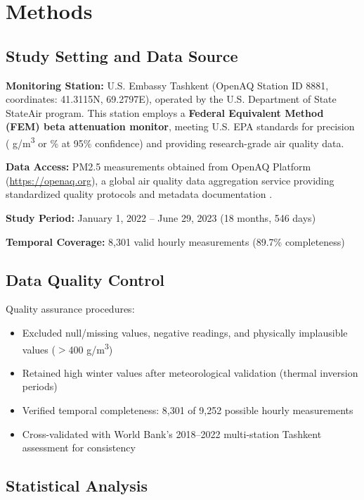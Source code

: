 \documentclass[11pt,a4paper]{article}
\begin{document}
\section{Methods}

\subsection{Study Setting and Data Source}

\textbf{Monitoring Station:} U.S. Embassy Tashkent (OpenAQ Station ID 8881, coordinates: 41.3115\textdegree N, 69.2797\textdegree E), operated by the U.S. Department of State StateAir program. This station employs a \textbf{Federal Equivalent Method (FEM) beta attenuation monitor}, meeting U.S. EPA standards for precision ( \textmu g/m\textsuperscript{3} or \% at 95\% confidence) and providing research-grade air quality data.

\textbf{Data Access:} PM2.5 measurements obtained from OpenAQ Platform (\url{https://openaq.org}), a global air quality data aggregation service providing standardized quality protocols and metadata documentation \citep{openaq2024}.

\textbf{Study Period:} January 1, 2022 -- June 29, 2023 (18 months, 546 days)

\textbf{Temporal Coverage:} 8,301 valid hourly measurements (89.7\% completeness)

\subsection{Data Quality Control}

Quality assurance procedures:
\begin{itemize}
    \item Excluded null/missing values, negative readings, and physically implausible values ($>$400 \textmu g/m\textsuperscript{3})
    \item Retained high winter values after meteorological validation (thermal inversion periods)
    \item Verified temporal completeness: 8,301 of 9,252 possible hourly measurements
    \item Cross-validated with World Bank's 2018--2022 multi-station Tashkent assessment for consistency
\end{itemize}


\subsection{Statistical Analysis}
\end{document}
